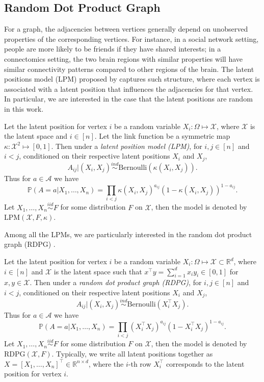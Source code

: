 \subsection{Random Dot Product Graph}
\label{sec:RDPG}
For a graph, the adjacencies between vertices generally depend on unobserved properties of the corresponding vertices. For instance, in a social network setting, people are more likely to be friends if they have shared interests; in a connectomics setting, the two brain regions with similar properties will have similar connectivity patterns compared to other regions of the brain.
The latent positions model (LPM) proposed by \citep{hoff2002latent} captures such structure, where each vertex is associated with a latent position that influences the adjacencies for that vertex. In particular, we are interested in the case that the latent positions are random in this work.

\begin{definition}
\label{def:LPM}
Let the latent position for vertex $i$ be a random variable $X_i: \Omega \mapsto \mathcal{X}$, where $\mathcal{X}$ is the latent space and $i \in [n]$. Let the link function be a symmetric map $\kappa: \mathcal{X}^2 \mapsto [0, 1]$. Then under a {\em{latent position model (LPM)}}, for $i, j \in [n]$ and $i < j$, conditioned on their respective latent positions $X_i$ and $X_j$,
\[
	A_{ij} | (X_i, X_j) \stackrel{ind}{\sim} \mathrm{Bernoulli}(\kappa(X_i, X_j)).
\]
Thus for $a \in \mathcal{A}$ we have
\[
	\mathbb{P}(A = a | X_1, \dots, X_n) = \prod_{i < j} \kappa(X_i, X_j)^{a_{ij}} (1 - \kappa(X_i, X_j))^{1 - a_{ij}}.
\]
Let $X_1, \dots, X_n \stackrel{iid}{\sim} F$ for some distribution $F$ on $\mathcal{X}$, then the model is denoted by $\mathrm{LPM}(\mathcal{X}, F, \kappa)$.
\end{definition}

Among all the LPMs, we are particularly interested in the random dot product graph (RDPG) \citep{young2007random, nickel2007random}.

\begin{definition} 
\label{def:RDPG}
Let the latent position for vertex $i$ be a random variable $X_i: \Omega \mapsto \mathcal{X} \subset \mathbb{R}^{d}$, where $i \in [n]$ and $\mathcal{X}$ is the latent space such that $x^{\top} y = \sum_{i = 1}^d x_i y_i \in [0, 1]$ for $x, y \in \mathcal{X}$. Then under a {\em{random dot product graph (RDPG)}}, for $i, j \in [n]$ and $i < j$, conditioned on their respective latent positions $X_i$ and $X_j$,
\[
	A_{ij} | (X_i, X_j) \stackrel{ind}{\sim} \mathrm{Bernoulli}(X_i^{\top} X_j).
\]
Thus for $a \in \mathcal{A}$ we have
\[
	\mathbb{P}(A = a | X_1, \dots, X_n) = \prod_{i < j} (X_i^{\top} X_j)^{a_{ij}} (1 - X_i^{\top} X_j)^{1 - a_{ij}}.
\]
Let $X_1, \dots, X_n \stackrel{iid}{\sim} F$ for some distribution $F$ on $\mathcal{X}$, then the model is denoted by $\mathrm{RDPG}(\mathcal{X}, F)$.
Typically,  we write all latent positions together as $X = [X_1, \dots, X_n]^{\top} \in \mathbb{R}^{n \times d}$, where the $i$-th row $X_i^{\top}$ corresponds to the latent position for vertex $i$.
\end{definition}

